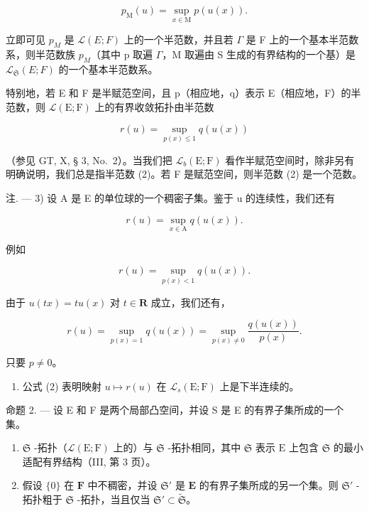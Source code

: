 \[
p _ {\mathrm{M}} (u) = \sup _ {x \in \mathrm{M}} p (u (x)).\tag{1}
\]

立即可见 \(p_{M}\) 是 \(\mathcal{L}(E;F)\) 上的一个半范数，并且若 \(\Gamma\) 是 F 上的一个基本半范数系，则半范数族 \(p_{M}\)（其中 p 取遍 \(\Gamma\)，M 取遍由 S 生成的有界结构的一个基）是 \(\mathcal{L}_{\mathfrak{S}}(E;F)\) 的一个基本半范数系。

特别地，若 E 和 F 是半赋范空间，且 p（相应地，q）表示 E（相应地，F）的半范数，则 \(\mathcal{L}(\mathrm{E};\mathrm{F})\) 上的有界收敛拓扑由半范数

\[
r (u) = \sup _ {p (x) \leqslant 1} q (u (x))\tag{2}
\]

（参见 GT, X, § 3, No.~2）。当我们把 \(\mathcal{L}_b(\mathrm{E};\mathrm{F})\) 看作半赋范空间时，除非另有明确说明，我们总是指半范数 (2)。若 F 是赋范空间，则半范数 (2) 是一个范数。

注. --- 3) 设 A 是 E 的单位球的一个稠密子集。鉴于 u 的连续性，我们还有

\[
r (u) = \sup _ {x \in \mathrm{A}} q (u (x)).\tag{3}
\]

例如

\[
r (u) = \sup _ {p (x) <   1} q (u (x)).\tag{4}
\]

由于 \(u(tx) = tu(x)\) 对 \(t \in \mathbf{R}\) 成立，我们还有，

\[
r (u) = \sup _ {p (x) = 1} q (u (x)) = \sup _ {p (x) \neq 0} \frac {q (u (x))}{p (x)}.\tag{5}
\]

只要 \(p \neq 0\)。

\begin{enumerate}
\def\labelenumi{\arabic{enumi})}
\setcounter{enumi}{3}
\tightlist
\item
  公式 (2) 表明映射 \(u \mapsto r(u)\) 在 \(\mathcal{L}_s(\mathrm{E};\mathrm{F})\) 上是下半连续的。
\end{enumerate}

命题 2. --- 设 E 和 F 是两个局部凸空间，并设 S 是 E 的有界子集所成的一个集。

\begin{enumerate}
\def\labelenumi{\arabic{enumi})}
\item
  \(\mathfrak{S}\) -拓扑（\(\mathcal{L}(\mathrm{E};\mathrm{F})\) 上的）与 \(\mathfrak{S}\) -拓扑相同，其中 \(\mathfrak{S}\) 表示 \(\mathrm{E}\) 上包含 \(\mathfrak{S}\) 的最小适配有界结构（III, 第 3 页）。
\item
  假设 \(\{0\}\) 在 \(\mathbf{F}\) 中不稠密，并设 \(\mathfrak{S}'\) 是 \(\mathbf{E}\) 的有界子集所成的另一个集。则 \(\mathfrak{S}'\) -拓扑粗于 \(\mathfrak{S}\) -拓扑，当且仅当 \(\mathfrak{S}' \subset \tilde{\mathfrak{S}}\)。
\end{enumerate}

